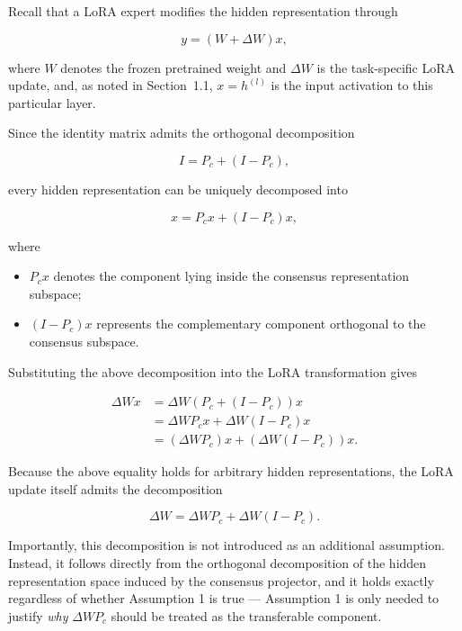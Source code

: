 \documentclass[a4paper]{article}
\begin{document}
Recall that a LoRA expert modifies the hidden representation through

\begin{equation}
y=(W+\Delta W)x,
\end{equation}

where $W$ denotes the frozen pretrained weight and $\Delta W$ is the task-specific LoRA update, and, as noted in Section~1.1, $x=h^{(l)}$ is the input activation to this particular layer.

Since the identity matrix admits the orthogonal decomposition

\begin{equation}
I=P_c+(I-P_c),
\end{equation}

every hidden representation can be uniquely decomposed into

\begin{equation}
x=P_cx+(I-P_c)x,
\end{equation}

where

\begin{itemize}
\item $P_cx$ denotes the component lying inside the consensus representation subspace;

\item $(I-P_c)x$ represents the complementary component orthogonal to the consensus subspace.
\end{itemize}

Substituting the above decomposition into the LoRA transformation gives

\begin{align}
\Delta Wx
&=
\Delta W(P_c+(I-P_c))x
\\
&=
\Delta WP_cx
+
\Delta W(I-P_c)x
\\
&=
(\Delta WP_c)x
+
(\Delta W(I-P_c))x.
\end{align}

Because the above equality holds for arbitrary hidden representations, the LoRA update itself admits the decomposition

\begin{equation}
\boxed{
\Delta W
=
\Delta W P_c
+
\Delta W(I-P_c).
}
\end{equation}

Importantly, this decomposition is not introduced as an additional assumption. Instead, it follows directly from the orthogonal decomposition of the hidden representation space induced by the consensus projector, and it holds exactly regardless of whether Assumption 1 is true — Assumption 1 is only needed to justify \emph{why} $\Delta W P_c$ should be treated as the transferable component.
\end{document}

